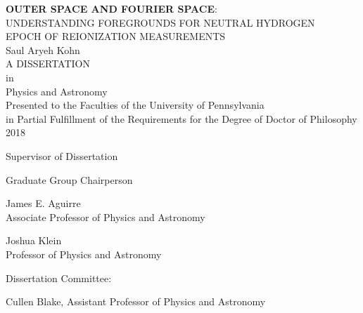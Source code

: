 \documentclass[12pt,twoside,openany]{book}
\newcommand{\doublespaced}{\renewcommand{\baselinestretch}{2}\normalfont}
\newcommand{\singlespaced}{\renewcommand{\baselinestretch}{1}\normalfont}
\newcommand{\halfspaced}{\renewcommand{\baselinestretch}{1.5}\normalfont}
\newcommand{\tita}{{\bf OUTER SPACE AND FOURIER SPACE}:\\UNDERSTANDING FOREGROUNDS FOR NEUTRAL HYDROGEN\\EPOCH OF REIONIZATION MEASUREMENTS}
\begin{document}
\frontmatter
\doublespaced
\thispagestyle{empty}
\parskip=0.3in
\begin{center}
{\tita }\\

Saul Aryeh Kohn\\

A DISSERTATION\\

in\\ 

Physics and Astronomy\\

Presented to the Faculties of the University of Pennsylvania \\
in Partial Fulfillment of the Requirements for the Degree of Doctor of Philosophy\\

2018
\end{center}
\parskip=0in

\begin{multicols}{2}
\noindent Supervisor of Dissertation \\

\begin{flushright}
\noindent Graduate Group Chairperson\\
\end{flushright}

\end{multicols}

\noindent\makebox[0in][l]{\rule[2ex]{2.8in}{.3mm}} \hspace{3.05in} \makebox[0in][l]{\rule[2ex]{2.8in}{.3mm}} 
\vspace{-.5in}
\begin{multicols}{2}
\singlespaced
\noindent James E. Aguirre\\ \small Associate Professor of Physics and Astronomy\\

\normalsize

\begin{flushright}
Joshua Klein\\ \small Professor of Physics and Astronomy
\end{flushright}
\end{multicols}

\halfspaced
\noindent Dissertation Committee:

\noindent Cullen Blake, Assistant Professor of Physics and Astronomy
\end{document}
